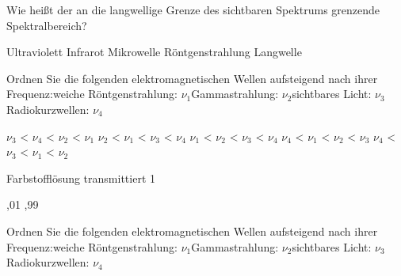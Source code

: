 \documentclass[11pt]{exam}
\begin{document}
\setlength{\voffset}{-0.5in}
\setlength{\headsep}{5pt}

\hspace{2mm}
 \hspace{5mm}
\vspace{4mm}

\begin{questions}

\question Wie heißt der an die langwellige Grenze des sichtbaren Spektrums grenzende Spektralbereich?

\begin{choices}
	\choice Ultraviolett
	\choice Infrarot
	\choice Mikrowelle
	\choice Röntgenstrahlung
	\choice Langwelle
\end{choices}

\vspace{3mm}\question Ordnen Sie die folgenden elektromagnetischen Wellen aufsteigend nach ihrer Frequenz:weiche Röntgenstrahlung: \( \nu_1 \)Gammastrahlung: \( \nu_2 \)sichtbares Licht: \( \nu_3 \)Radiokurzwellen: \( \nu_4 \)

\begin{choices}
	\choice \( \nu_3 \) < \( \nu_4 \) < \( \nu_2 \) < \( \nu_1 \)
	\choice \( \nu_2 \) < \( \nu_1 \) < \( \nu_3 \) < \( \nu_4 \)
	\choice \( \nu_1 \) < \( \nu_2 \) < \( \nu_3 \) < \( \nu_4 \)
	\choice \( \nu_4 \) < \( \nu_1 \) < \( \nu_2 \) < \( \nu_3 \)
	\choice \( \nu_4 \) < \( \nu_3 \) < \( \nu_1 \) < \( \nu_2 \)
\end{choices}

\vspace{3mm}\question Farbstofflösung transmittiert 1 %

\begin{choices}
	,01
	,99
\end{choices}

\vspace{3mm}\question Ordnen Sie die folgenden elektromagnetischen Wellen aufsteigend nach ihrer Frequenz:weiche Röntgenstrahlung: \( \nu_1 \)Gammastrahlung: \( \nu_2 \)sichtbares Licht: \( \nu_3 \)Radiokurzwellen: \( \nu_4 \)


\end{questions}
\end{document}
